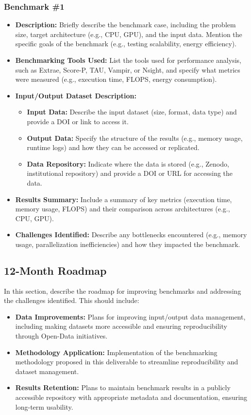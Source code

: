 \subsubsection{Benchmark \#1}
\begin{itemize}
    \item \textbf{Description:} Briefly describe the benchmark case, including the problem size, target architecture (e.g., CPU, GPU), and the input data. Mention the specific goals of the benchmark (e.g., testing scalability, energy efficiency).
    \item \textbf{Benchmarking Tools Used:} List the tools used for performance analysis, such as Extrae, Score-P, TAU, Vampir, or Nsight, and specify what metrics were measured (e.g., execution time, FLOPS, energy consumption).
    \item \textbf{Input/Output Dataset Description:}
        \begin{itemize}
            \item \textbf{Input Data:} Describe the input dataset (size, format, data type) and provide a DOI or link to access it.
            \item \textbf{Output Data:} Specify the structure of the results (e.g., memory usage, runtime logs) and how they can be accessed or replicated.
            \item \textbf{Data Repository:} Indicate where the data is stored (e.g., Zenodo, institutional repository) and provide a DOI or URL for accessing the data.
        \end{itemize}
    \item \textbf{Results Summary:} Include a summary of key metrics (execution time, memory usage, FLOPS) and their comparison across architectures (e.g., CPU, GPU).
    \item \textbf{Challenges Identified:} Describe any bottlenecks encountered (e.g., memory usage, parallelization inefficiencies) and how they impacted the benchmark.
\end{itemize}

\subsection{12-Month Roadmap}
\label{sec:WP7:Feel++:roadmap}

In this section, describe the roadmap for improving benchmarks and addressing the challenges identified. This should include:
\begin{itemize}
    \item \textbf{Data Improvements:} Plans for improving input/output data management, including making datasets more accessible and ensuring reproducibility through Open-Data initiatives.
    \item \textbf{Methodology Application:} Implementation of the benchmarking methodology proposed in this deliverable to streamline reproducibility and dataset management.
    \item \textbf{Results Retention:} Plans to maintain benchmark results in a publicly accessible repository with appropriate metadata and documentation, ensuring long-term usability.
\end{itemize}